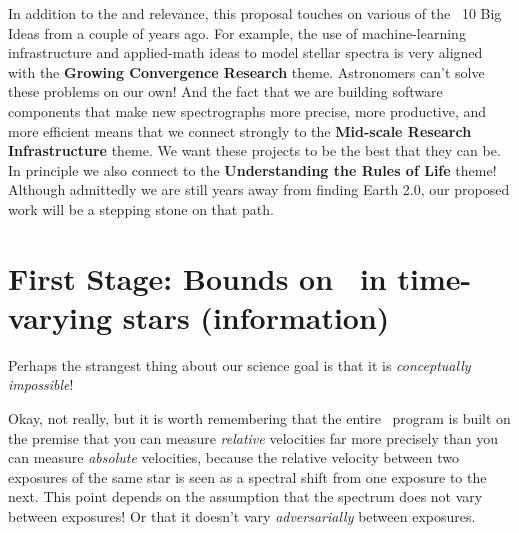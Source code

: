 \documentclass[12pt, letterpaper]{article}
\begin{document}
In addition to the  and  relevance, this proposal touches on
various of the \NSF\ 10 Big Ideas from a couple of years ago.
For example, the use of machine-learning infrastructure and applied-math ideas to model
stellar spectra is very aligned with the \textbf{Growing Convergence Research} theme.
Astronomers can't solve these problems on our own!
And the fact that we are building software components that make new spectrographs more
precise, more productive, and more efficient means that we connect strongly to the
\textbf{Mid-scale Research Infrastructure} theme.
We want these projects to be the best that they can be.
In principle we also connect to the \textbf{Understanding the Rules of Life} theme! 
Although admittedly we are still years away from finding
Earth 2.0, our proposed work will be a stepping stone on that path.


\section{First Stage: Bounds on \EPRV\ in time-varying stars (information)}

Perhaps the strangest thing about our science goal is that
it is \emph{conceptually impossible}!

Okay, not really, but it is worth remembering that the entire
\EPRV\ program is built on the premise that you can measure
\emph{relative} velocities far more precisely than you can measure
\emph{absolute} velocities, because the relative velocity between two
exposures of the same star is seen as a spectral shift from one
exposure to the next.
This point depends on the assumption that the spectrum does not vary
between exposures!
Or that it doesn't vary \emph{adversarially} between exposures.
\end{document}
